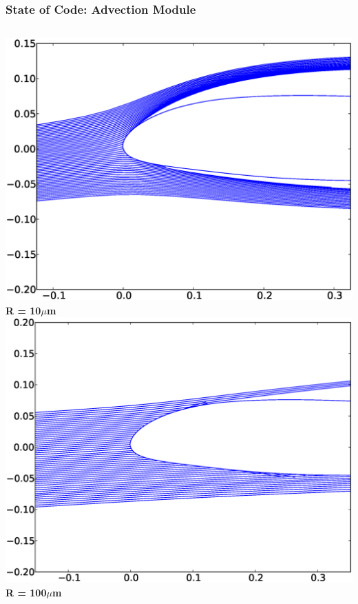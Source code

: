 \documentclass[9pt]{beamer}
\begin{document}
\begin{frame}
\frametitle{State of Code: Advection Module}
\label{sec-3-7}

\begin{columns}[c]
    \centering
    \includegraphics[width=1\textwidth]{ExampleR10em6} \\
    {\bf R = 10$\mu$m}
    \centering
    \includegraphics[width=1\textwidth]{ExampleR100em6} \\
    {\bf R = 100$\mu$m}
\end{columns}
\end{frame}
\end{document}
